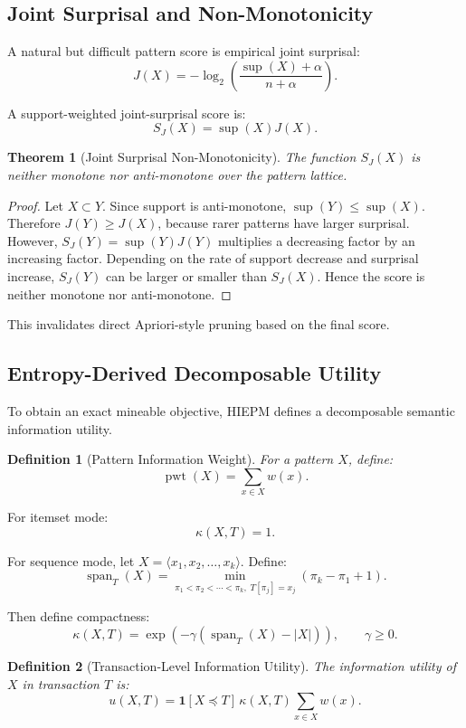 \documentclass[11pt,a4paper]{article}
\newtheorem{definition}{Definition}
\newtheorem{theorem}{Theorem}
\newcommand{\supp}{\operatorname{sup}}
\newcommand{\spanop}{\operatorname{span}}
\newcommand{\pwt}{\operatorname{pwt}}
\begin{document}
\subsection{Joint Surprisal and Non-Monotonicity}

A natural but difficult pattern score is empirical joint surprisal:
\[
J(X)=
-\log_2\left(
\frac{\supp(X)+\alpha}{n+\alpha}
\right).
\]

A support-weighted joint-surprisal score is:
\[
S_J(X)=\supp(X)J(X).
\]

\begin{theorem}[Joint Surprisal Non-Monotonicity]
The function \(S_J(X)\) is neither monotone nor anti-monotone over the pattern lattice.
\end{theorem}

\begin{proof}
Let \(X\subset Y\). Since support is anti-monotone, \(\supp(Y)\le\supp(X)\). Therefore \(J(Y)\ge J(X)\), because rarer patterns have larger surprisal. However, \(S_J(Y)=\supp(Y)J(Y)\) multiplies a decreasing factor by an increasing factor. Depending on the rate of support decrease and surprisal increase, \(S_J(Y)\) can be larger or smaller than \(S_J(X)\). Hence the score is neither monotone nor anti-monotone.
\end{proof}

This invalidates direct Apriori-style pruning based on the final score.

\subsection{Entropy-Derived Decomposable Utility}

To obtain an exact mineable objective, HIEPM defines a decomposable semantic information utility.

\begin{definition}[Pattern Information Weight]
For a pattern \(X\), define:
\[
\pwt(X)=\sum_{x\in X}w(x).
\]
\end{definition}

For itemset mode:
\[
\kappa(X,T)=1.
\]

For sequence mode, let \(X=\langle x_1,x_2,\dots,x_k\rangle\). Define:
\[
\spanop_T(X)
=
\min_{\pi_1<\pi_2<\cdots<\pi_k,\;T[\pi_j]=x_j}
(\pi_k-\pi_1+1).
\]

Then define compactness:
\[
\kappa(X,T)=
\exp\left(
-\gamma(\spanop_T(X)-|X|)
\right),
\qquad
\gamma\ge0.
\]

\begin{definition}[Transaction-Level Information Utility]
The information utility of \(X\) in transaction \(T\) is:
\[
u(X,T)=
\mathbf{1}[X\preceq T]\,
\kappa(X,T)
\sum_{x\in X}w(x).
\]
\end{definition}
\end{document}
